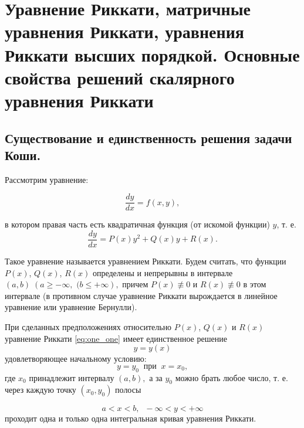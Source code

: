 \chapter{Уравнение Риккати, матричные уравнения Риккати, уравнения Риккати высших порядкой. Основные свойства решений скалярного уравнения Риккати} 

\section{Существование и единственность решения задачи Коши.}
Рассмотрим уравнение:

$$\dfrac{dy}{dx} = f \left( x, y \right),$$

в котором правая часть есть квадратичная функция (от искомой функции) $y$, т. е.
\begin{equation}  \label{eq:one_one}
    \dfrac{dy}{dx} = P \left( x \right) y^2 + Q \left( x \right) y + R \left( x \right).
\end{equation}

Такое уравнение называется уравнением Риккати. Будем считать, что функции $P \left( x \right)$, $Q \left( x \right)$, $R \left( x \right)$ определены и непрерывны в интервале $\left( a, b \right) \; \left( a \geqslant -\infty,\right.$ $\left.( b \leqslant +\infty \right),$ причем $P \left( x \right) \not\equiv 0$ и $R \left( x \right) \not\equiv 0$ в этом интервале (в противном случае уравнение Риккати вырождается в линейное уравнение или уравнение Бернулли).

При сделанных предположениях относительно $P \left( x \right)$, $Q \left( x \right)$ и $R \left( x \right)$ уравнение Риккати \ref{eq:one_one} имеет единственное решение
\begin{equation}  \label{eq:one_two}
    y = y \left( x \right)
\end{equation}
удовлетворяющее начальному условию:
\begin{equation}  \label{eq:one_three}
    y = y_{0} \; \; \text{при} \; \; x = x_{0},
\end{equation}
где $x_{0}$ принадлежит интервалу $\left( a, b \right),$ а за $y_{0}$ можно брать любое число, т. е. через каждую точку $\left( x_{0}, y_{0} \right)$ полосы

\begin{equation}  \label{eq:one_four}
    a < x < b, \; \; -\infty < y < +\infty
\end{equation}
проходит одна и только одна интегральная кривая уравнения Риккати.

